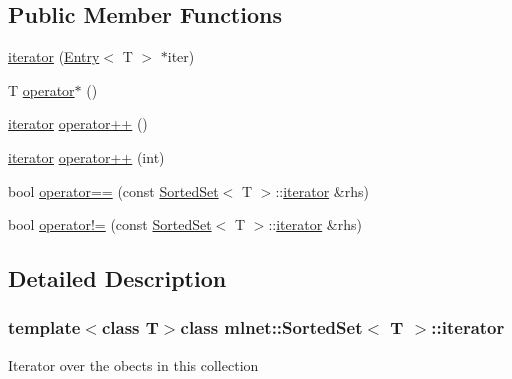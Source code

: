 \subsection*{Public Member Functions}
\begin{DoxyCompactItemize}
\item 
\hyperlink{classmlnet_1_1_sorted_set_1_1iterator_abfc1ad310ea30a6e0f9b0566536b81a6}{iterator} (\hyperlink{classmlnet_1_1_entry}{Entry}$<$ T $>$ $\ast$iter)
\item 
T \hyperlink{classmlnet_1_1_sorted_set_1_1iterator_a89f04d3d89bd68deca3d479d144ecd65}{operator$\ast$} ()
\item 
\hyperlink{classmlnet_1_1_sorted_set_1_1iterator}{iterator} \hyperlink{classmlnet_1_1_sorted_set_1_1iterator_a6ab754a90c99638e29a3c2d50c038a89}{operator++} ()
\item 
\hyperlink{classmlnet_1_1_sorted_set_1_1iterator}{iterator} \hyperlink{classmlnet_1_1_sorted_set_1_1iterator_a95afe4bf10cd2f15c144a452803bd41c}{operator++} (int)
\item 
bool \hyperlink{classmlnet_1_1_sorted_set_1_1iterator_ac09be91863ffe86b2971ea099bbe3779}{operator==} (const \hyperlink{classmlnet_1_1_sorted_set}{Sorted\+Set}$<$ T $>$\+::\hyperlink{classmlnet_1_1_sorted_set_1_1iterator}{iterator} \&rhs)
\item 
bool \hyperlink{classmlnet_1_1_sorted_set_1_1iterator_aca02d0e9e432005af28e090cebe20716}{operator!=} (const \hyperlink{classmlnet_1_1_sorted_set}{Sorted\+Set}$<$ T $>$\+::\hyperlink{classmlnet_1_1_sorted_set_1_1iterator}{iterator} \&rhs)
\end{DoxyCompactItemize}


\subsection{Detailed Description}
\subsubsection*{template$<$class T$>$class mlnet\+::\+Sorted\+Set$<$ T $>$\+::iterator}

Iterator over the obects in this collection 

